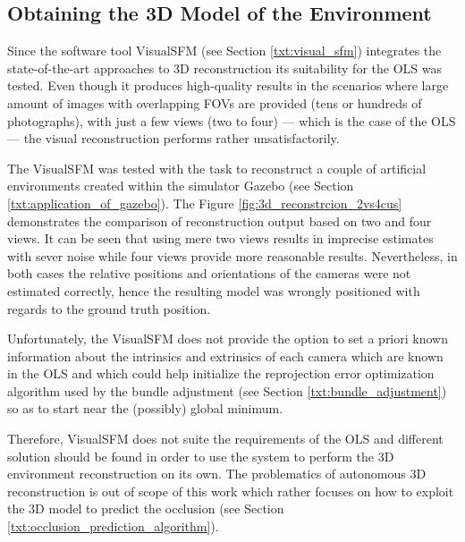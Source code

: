 \subsection{Obtaining the 3D Model of the Environment} \label{txt:obtaining_the_3d_model}

Since the software tool VisualSFM (see Section \ref{txt:visual_sfm}) integrates the state-of-the-art approaches to 3D reconstruction its suitability for the OLS was tested. Even though it produces high-quality results in the scenarios where large amount of images with overlapping FOVs are provided (tens or hundreds of photographs), with just a few views (two to four) --- which is the case of the OLS --- the visual reconstruction performs rather unsatisfactorily.

The VisualSFM was tested with the task to reconstruct a couple of artificial environments created within the simulator Gazebo (see Section \ref{txt:application_of_gazebo}). The Figure \ref{fig:3d_reconstrcion_2vs4cus} demonstrates the comparison of reconstruction output based on two and four views. It can be seen that using mere two views results in imprecise estimates with sever noise while four views provide more reasonable results. Nevertheless, in both cases the relative positions and orientations of the cameras were not estimated correctly, hence the resulting model was wrongly positioned with regards to the ground truth position.

Unfortunately, the VisualSFM does not provide the option to set a priori known information about the intrinsics and extrinsics of each camera which are known in the OLS and which could help initialize the reprojection error optimization algorithm used by the bundle adjustment (see Section \ref{txt:bundle_adjustment}) so as to start near the (possibly) global minimum.

Therefore, VisualSFM does not suite the requirements of the OLS and different solution should be found in order to use the system to perform the 3D environment reconstruction on its own. The problematics of autonomous 3D reconstruction is out of scope of this work which rather focuses on how to exploit the 3D model to predict the occlusion (see Section \ref{txt:occlusion_prediction_algorithm}).

